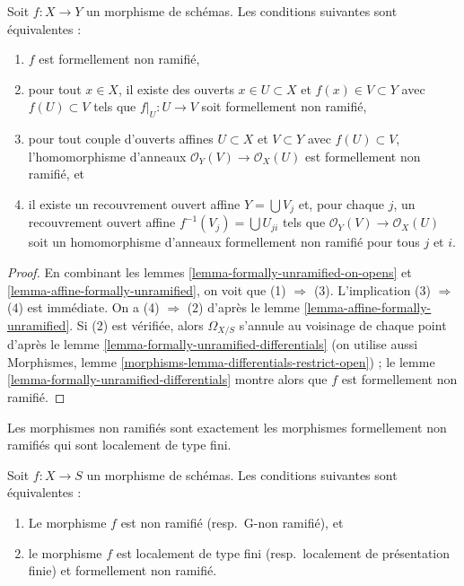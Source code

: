 \begin{lemma}
\label{lemma-formally-unramified}
Soit $f : X \to Y$ un morphisme de schémas. Les conditions suivantes sont équivalentes :
\begin{enumerate}
\item $f$ est formellement non ramifié,
\item pour tout $x \in X$, il existe des ouverts $x \in U \subset X$ et
$f(x) \in V \subset Y$ avec $f(U) \subset V$ tels que
$f|_U : U \to V$ soit formellement non ramifié,
\item pour tout couple d'ouverts affines $U \subset X$ et $V \subset Y$
avec $f(U) \subset V$, l'homomorphisme d'anneaux $\mathcal{O}_Y(V) \to \mathcal{O}_X(U)$
est formellement non ramifié, et
\item il existe un recouvrement ouvert affine $Y = \bigcup V_j$ et,
pour chaque $j$, un recouvrement ouvert affine $f^{-1}(V_j) = \bigcup U_{ji}$
tels que $\mathcal{O}_Y(V) \to \mathcal{O}_X(U)$ soit un homomorphisme d'anneaux
formellement non ramifié pour tous $j$ et $i$.
\end{enumerate}
\end{lemma}

\begin{proof}
En combinant les lemmes \ref{lemma-formally-unramified-on-opens} et
\ref{lemma-affine-formally-unramified}, on voit que (1) $\Rightarrow$ (3).
L'implication (3) $\Rightarrow$ (4) est immédiate.
On a (4) $\Rightarrow$ (2) d'après le lemme \ref{lemma-affine-formally-unramified}.
Si (2) est vérifiée, alors $\Omega_{X/S}$ s'annule au voisinage
de chaque point d'après le lemme \ref{lemma-formally-unramified-differentials}
(on utilise aussi Morphismes, lemme
\ref{morphisms-lemma-differentials-restrict-open}) ; le
lemme \ref{lemma-formally-unramified-differentials} montre alors que $f$
est formellement non ramifié.
\end{proof}

\begin{lemma}
\label{lemma-unramified-formally-unramified}
\begin{slogan}
Les morphismes non ramifiés sont exactement les morphismes formellement non ramifiés
qui sont localement de type fini.
\end{slogan}
Soit $f : X \to S$ un morphisme de schémas.
Les conditions suivantes sont équivalentes :
\begin{enumerate}
\item Le morphisme $f$ est non ramifié (resp.\ G-non ramifié), et
\item le morphisme $f$ est localement de type fini (resp.\ localement de
présentation finie) et formellement non ramifié.
\end{enumerate}
\end{lemma}

